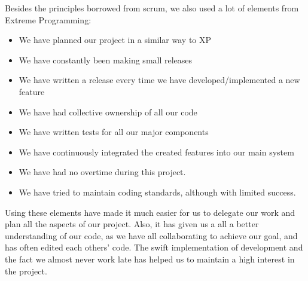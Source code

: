 Besides the principles borrowed from scrum, we also used a lot of elements from Extreme Programming:
\begin{itemize}
\item We have planned our project in a similar way to XP
\item We have constantly been making small releases 
\item We have written a release every time we have developed/implemented a new feature
\item We have had collective ownership of all our code
\item We have written tests for all our major components 
\item We have continuously integrated the created features into our main system
\item We have had no overtime during this project.
\item We have tried to maintain coding standards, although with limited success.
\end{itemize}

Using these elements have made it much easier for us to delegate our work and plan all the aspects of our project. Also, it has given us a all a better understanding of our code, as we have all collaborating to achieve our goal, and has often edited each others' code. The swift implementation of development and the fact we almost never work late has helped us to maintain a high interest in the project.